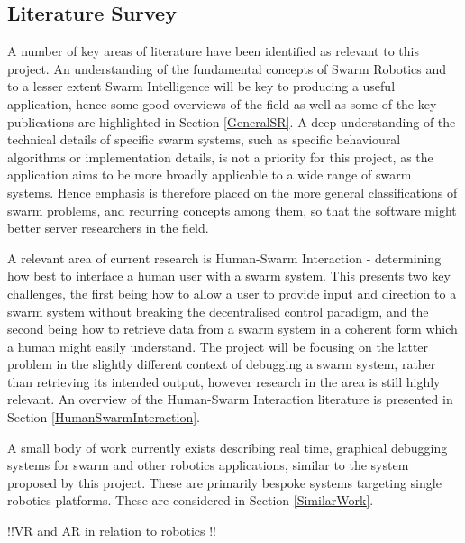 \documentclass[titlepage,hidelinks,10pt]{article}
\begin{document}
\begin{multicols*}{2}
\section{Literature Survey}
A number of key areas of literature have been identified as relevant to this project. An understanding of the fundamental concepts of Swarm Robotics and to a lesser extent Swarm Intelligence will be key to producing a useful application, hence some good overviews of the field as well as some of the key publications are highlighted in Section \ref{GeneralSR}. A deep understanding of the technical details of specific swarm systems, such as specific behavioural algorithms or implementation details, is not a priority for this project, as the application aims to be more broadly applicable to a wide range of swarm systems. Hence emphasis is therefore placed on the more general classifications of swarm problems, and recurring concepts among them, so that the software might better server researchers in the field.

A relevant area of current research is Human-Swarm Interaction - determining how best to interface a human user with a swarm system. This presents two key challenges, the first being how to allow a user to provide input and direction to a swarm system without breaking the decentralised control paradigm, and the second being how to retrieve data from a swarm system in a coherent form which a human might easily understand. The project will be focusing on the latter problem in the slightly different context of debugging a swarm system, rather than retrieving its intended output, however research in the area is still highly relevant. An overview of the Human-Swarm Interaction literature is presented in Section \ref{HumanSwarmInteraction}.

A small body of work currently exists describing real time, graphical debugging systems for swarm and other robotics applications, similar to the system proposed by this project. These are primarily bespoke systems targeting single robotics platforms. These are considered in Section \ref{SimilarWork}.

!!VR and AR in relation to robotics !!


\end{multicols*}
\end{document}
